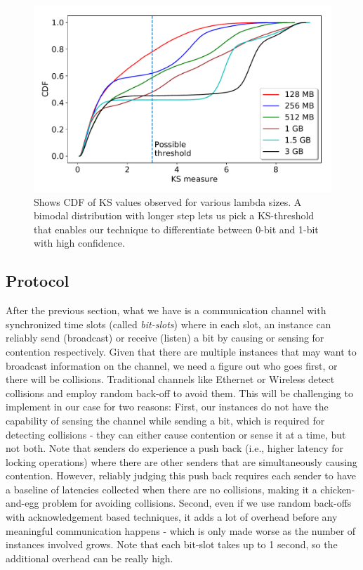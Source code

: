 \begin{figure}[!t]
  \includegraphics[width=.99\linewidth]{fig/ksvalues.pdf}
  \caption{Shows CDF of KS values observed for various lambda sizes. A bimodal distribution 
  with longer step lets us pick a KS-threshold that enables our technique to differentiate 
  between 0-bit and 1-bit with high confidence. 
\label{fig:ks_values}}
\end{figure}

\subsection{Protocol}
\label{sec:protocol}
After the previous section, what we have is a communication channel with 
synchronized time slots (called \textit{bit-slots}) where in each slot, an 
instance can reliably send (broadcast) or receive (listen) a bit by causing 
or sensing for contention respectively. Given that there are multiple instances that 
may want to 
broadcast information on the channel, we need a figure out who goes first, or 
there will be collisions. Traditional channels like Ethernet or Wireless 
detect collisions and employ random back-off to avoid them. This will be challenging 
to implement in our case for two reasons: First, our instances do not have the 
capability of sensing the channel while sending a bit, which 
is required for detecting collisions - they can either cause contention or sense 
it at a time, but not both. Note that senders do experience a push back 
(i.e., higher latency for locking operations) where there are other senders that 
are simultaneously causing contention. However, reliably judging this push back 
requires each sender to have a baseline of latencies collected when there are 
no collisions, making it a chicken-and-egg problem for avoiding collisions. 
Second, even if we use random back-offs with acknowledgement based techniques, it 
adds a lot of overhead before any meaningful communication happens - which is 
only made worse as the number of instances involved grows. Note that each bit-slot 
takes up to 1 second, so the additional overhead can be really high. 


